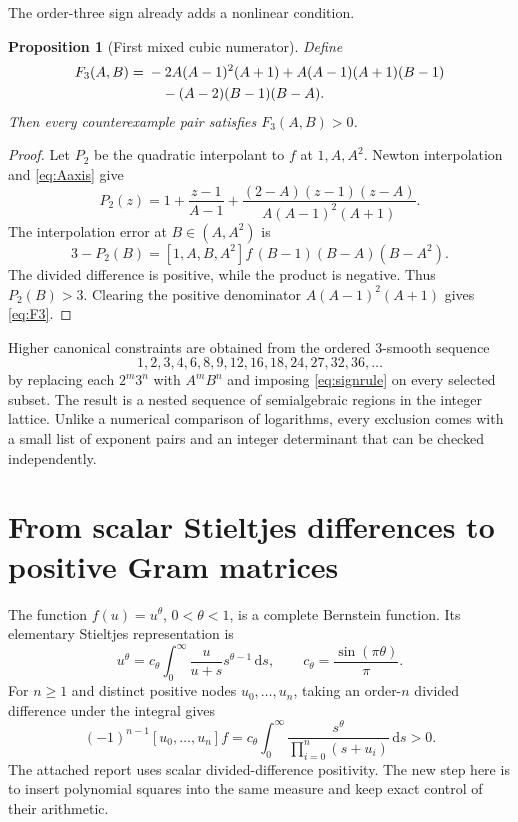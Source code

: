 \documentclass[11pt]{article}
\newtheorem{proposition}[theorem]{Proposition}
\theoremstyle{definition}
\theoremstyle{remark}
\newcommand{\dd}{\,\mathrm d}
\newcommand{\cst}{c_{\theta}}
\begin{document}
The order-three sign already adds a nonlinear condition.

\begin{proposition}[First mixed cubic numerator]\label{prop:F3}
Define
\begin{align}
 F_3(A,B)={}&-2A(A-1)^2(A+1)
 +A(A-1)(A+1)(B-1)\notag\\
 &\quad -(A-2)(B-1)(B-A).\label{eq:F3}
\end{align}
Then every counterexample pair satisfies $F_3(A,B)>0$.
\end{proposition}

\begin{proof}
Let $P_2$ be the quadratic interpolant to $f$ at $1,A,A^2$.  Newton interpolation and
\eqref{eq:Aaxis} give
\[
 P_2(z)=1+\frac{z-1}{A-1}
 +\frac{(2-A)(z-1)(z-A)}{A(A-1)^2(A+1)}.
\]
The interpolation error at $B\in(A,A^2)$ is
\[
 3-P_2(B)=[1,A,B,A^2]f\,(B-1)(B-A)(B-A^2).
\]
The divided difference is positive, while the product is negative.  Thus $P_2(B)>3$.
Clearing the positive denominator $A(A-1)^2(A+1)$ gives \eqref{eq:F3}.
\end{proof}

Higher canonical constraints are obtained from the ordered $3$-smooth sequence
\[
 1,2,3,4,6,8,9,12,16,18,24,27,32,36,\ldots
\]
by replacing each $2^m3^n$ with $A^mB^n$ and imposing \eqref{eq:signrule} on every selected
subset.  The result is a nested sequence of semialgebraic regions in the integer lattice.
Unlike a numerical comparison of logarithms, every exclusion comes with a small list of
exponent pairs and an integer determinant that can be checked independently.

\section{From scalar Stieltjes differences to positive Gram matrices}

The function $f(u)=u^\theta$, $0<\theta<1$, is a complete Bernstein function.  Its elementary
Stieltjes representation is
\begin{equation}\label{eq:stieltjes}
 u^\theta=\cst\int_0^\infty \frac{u}{u+s}s^{\theta-1}\dd s,
 \qquad \cst=\frac{\sin(\pi\theta)}{\pi}.
\end{equation}
For $n\ge1$ and distinct positive nodes $u_0,\ldots,u_n$, taking an order-$n$ divided
difference under the integral gives
\begin{equation}\label{eq:stieltjesdd}
 (-1)^{n-1}[u_0,\ldots,u_n]f
 =\cst\int_0^\infty\frac{s^\theta}{\prod_{i=0}^n(s+u_i)}\dd s>0.
\end{equation}
The attached report uses scalar divided-difference positivity.  The new step here is to
insert polynomial squares into the same measure and keep exact control of their arithmetic.
\end{document}
